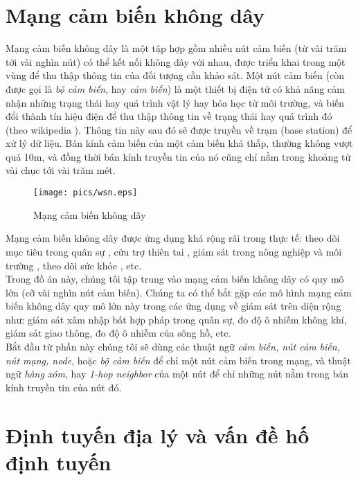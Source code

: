 \documentclass[12pt]{report}
\begin{document}
\section{Mạng cảm biến không dây}
\label{sec:1.1}
Mạng cảm biến không dây là một tập hợp gồm nhiều nút cảm biến (từ vài trăm tới vài nghìn nút) có thể kết nối không dây với nhau, được triển khai trong một vùng để thu thập thông tin của đối tượng cần khảo sát. Một nút cảm biến (còn được gọi là \textit{bộ cảm biến}, hay \textit{cảm biến}) là một thiết bị điện tử có khả năng cảm nhận những trạng thái hay quá trình vật lý hay hóa học từ môi trường, và biến đổi thành tín hiệu điện để thu thập thông tin về trạng thái hay quá trình đó (theo wikipedia \cite{wikisensor}). Thông tin này sau đó sẽ được truyền về trạm (base station) để xử lý dữ liệu. Bán kính cảm biến của một cảm biến khá thấp, thường không vượt quá 10m, và đồng thời bán kính truyền tin của nó cũng chỉ nằm trong khoảng từ vài chục tới vài trăm mét.\\
\begin{figure}[H]
\centering
\texttt{[image: pics/wsn.eps]}
\caption{Mạng cảm biến không dây}
\end{figure}
Mạng cảm biến không dây được ứng dụng khá rộng rãi trong thực tế: theo dõi mục tiêu trong quân sự \cite{military1,military2}, cứu trợ thiên tai \cite{disaster1, disaster2, disaster3, disaster4, disaster5}, giám sát trong nông nghiệp và môi trường \cite{agri1, agri2, agri3, agri4, agri5}, theo dõi sức khỏe \cite{health1, health2, health3}, etc.\\
Trong đồ án này, chúng tôi tập trung vào mạng cảm biến không dây có quy mô lớn (cỡ vài nghìn nút cảm biến). Chúng ta có thể bắt gặp các mô hình mạng cảm biến không dây quy mô lớn này trong các ứng dụng về giám sát trên diện rộng như: giám sát xâm nhập bất hợp pháp trong quân sự, đo độ ô nhiễm không khí, giám sát giao thông, đo độ ô nhiễm của sông hồ, etc.\\
Bắt đầu từ phần này chúng tôi sẽ dùng các thuật ngữ \textit{cảm biến, nút cảm biến, nút mạng, node}, hoặc \textit{bộ cảm biến} để chỉ một nút cảm biến trong mạng, và thuật ngữ \textit{hàng xóm}, hay \textit{1-hop neighbor} của một nút để chỉ những nút nằm trong bán kính truyền tin của nút đó. 

\section{Định tuyến địa lý và vấn đề hố định tuyến}
\label{sec:1.2}
\end{document}
